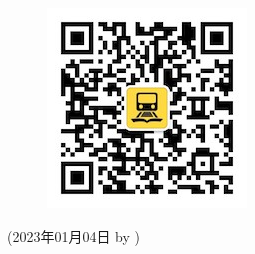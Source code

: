 \begin{enumerate}
\begin{minipage}{0.2\textwidth}
\begin{figure}[H]
                \includegraphics[width=0.95\columnwidth, center]{author-folder/Kai.Wu/qrcode_huitongstudent_1.jpg}
            \end{figure}
        \end{minipage}

\end{enumerate}


\begin{flushright}
(2023年01月04日 by \Wu)
\end{flushright}






% 
